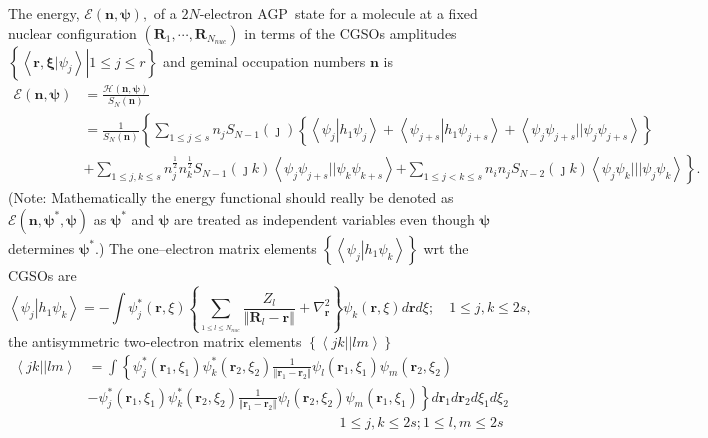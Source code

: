 \documentclass[aps,preprint]{revtex4}%
\begin{document}
The energy, $\mathcal{E}\left(  \mathbf{n,\psi}\right)  ,$ of a $2N$-electron
AGP\ state for a molecule at a fixed nuclear configuration $\left(
\mathbf{R}_{1},\cdots,\mathbf{R}_{N_{nuc}}\right)  $ in terms of the CGSOs
amplitudes $\left\{  \left.  \left\langle \left.  \mathbf{r,\xi}\right\vert
\psi_{j}\right\rangle \right\vert 1\leq j\leq r\right\}  $ and geminal
occupation numbers $\mathbf{n}$ is
\begin{align}
\mathcal{E}\left(  \mathbf{n,\psi}\right)   &  =\frac{\mathcal{H}\left(
\mathbf{n,\psi}\right)  }{S_{N}\left(  \mathbf{n}\right)  }\nonumber\\
&  =\frac{1}{S_{N}\left(  \mathbf{n}\right)  }\left\{  \sum_{1\leq j\leq
s}n_{j}S_{N-1}\left(  \jmath\right)  \left\{  \left\langle \psi_{j}\left\vert
h_{1}\psi_{j}\right.  \right\rangle +\left\langle \psi_{j+s}\left\vert
h_{1}\psi_{j+s}\right.  \right\rangle +\left\langle \psi_{j}\psi_{j+s}%
||\psi_{j}\psi_{j+s}\right\rangle \right\}  \right. \nonumber\\
&  +\sum_{1\leq j,k\leq s}n_{j}^{\frac{1}{2}}n_{k}^{\frac{1}{2}}S_{N-1}\left(
\jmath k\right)  \left\langle \psi_{j}\psi_{j+s}||\psi_{k}\psi_{k+s}%
\right\rangle \left.  +\sum_{1\leq j<k\leq s}n_{i}n_{j}S_{N-2}\left(  \jmath
k\right)  \left\langle \psi_{j}\psi_{k}|||\psi_{j}\psi_{k}\right\rangle
\right\}  . \label{energy}%
\end{align}
(Note: Mathematically the energy functional should really be denoted as
$\mathcal{E}\left(  \mathbf{n,\psi}^{\ast}\mathbf{,\psi}\right)  $ as
$\mathbf{\psi}^{\ast}$ and $\mathbf{\psi}$ are treated as independent
variables even though $\mathbf{\psi}$ determines $\mathbf{\psi}^{\ast}$.) The
one--electron matrix elements $\left\{  \left\langle \psi_{j}\left\vert
h_{1}\psi_{k}\right.  \right\rangle \right\}  $ wrt the CGSOs are
\begin{equation}
\left\langle \psi_{j}\left\vert h_{1}\psi_{k}\right.  \right\rangle =-\int
\psi_{j}^{\ast}\left(  \mathbf{r},\xi\right)  \left\{  \sum_{_{1\leq l\leq
N_{nuc}}}\frac{Z_{l}}{\left\Vert \mathbf{R}_{l}-\mathbf{r}\right\Vert }%
+\nabla_{\mathbf{r}}^{2}\right\}  \psi_{k}\left(  \mathbf{r},\xi\right)
d\mathbf{r}d\xi;\quad1\leq j,k\leq2s, \label{h1}%
\end{equation}
the antisymmetric two-electron matrix elements $\left\{  \left\langle
jk||lm\right\rangle \right\}  $
\begin{align}
\left\langle jk||lm\right\rangle  &  =\int\left\{  \psi_{j}^{\ast}\left(
\mathbf{r}_{1},\xi_{1}\right)  \psi_{k}^{\ast}\left(  \mathbf{r}_{2},\xi
_{2}\right)  \frac{1}{\left\Vert \mathbf{r}_{1}-\mathbf{r}_{2}\right\Vert
}\psi_{l}\left(  \mathbf{r}_{1},\xi_{1}\right)  \psi_{m}\left(  \mathbf{r}%
_{2},\xi_{2}\right)  \right. \nonumber\\
&  -\left.  \psi_{j}^{\ast}\left(  \mathbf{r}_{1},\xi_{1}\right)  \psi
_{k}^{\ast}\left(  \mathbf{r}_{2},\xi_{2}\right)  \frac{1}{\left\Vert
\mathbf{r}_{1}-\mathbf{r}_{2}\right\Vert }\psi_{l}\left(  \mathbf{r}_{2}%
,\xi_{2}\right)  \psi_{m}\left(  \mathbf{r}_{1},\xi_{1}\right)  \right\}
d\mathbf{r}_{1}d\mathbf{r}_{2}d\xi_{1}d\xi_{2}\nonumber\\
&  \left.  {}\right.  \qquad\qquad\qquad\qquad\qquad\qquad\qquad\qquad
\qquad1\leq j,k\leq2s;1\leq l,m\leq2s \label{h2}%
\end{align}
\end{document}
